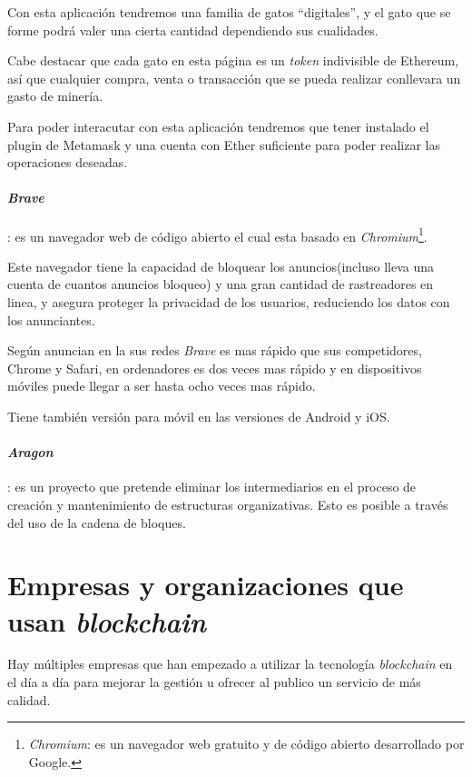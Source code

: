 Con esta aplicación tendremos una familia de gatos ``digitales''\cite{gatos}, y el gato que se forme podrá valer una cierta cantidad dependiendo sus cualidades. 

Cabe destacar que cada gato en esta página es un \textit{token} indivisible de Ethereum, así que cualquier compra, venta o transacción que se pueda realizar conllevara un  gasto de minería.

Para poder interacutar con esta aplicación tendremos que tener instalado el plugin de Metamask y una cuenta con Ether suficiente para poder realizar las operaciones deseadas.

\paragraph{\textit{Brave}}\cite{brave}: es un navegador web de código abierto el cual esta basado en \textit{Chromium}\footnote{\textit{Chromium}:\cite{chromium} es un navegador web gratuito y de código abierto desarrollado por Google.}.

Este navegador tiene la capacidad de bloquear los anuncios(incluso lleva una cuenta de cuantos anuncios bloqueo) y una gran cantidad de rastreadores en linea, y asegura proteger la privacidad de los usuarios, reduciendo los datos con los anunciantes.

Según anuncian en la sus redes \textit{Brave} es mas rápido que sus competidores, Chrome y Safari, en ordenadores es dos veces mas rápido y en dispositivos móviles puede llegar a ser hasta ocho veces mas rápido.

Tiene también versión para móvil en las versiones de Android y iOS.

\paragraph{\textit{Aragon}}: es un proyecto que pretende eliminar los intermediarios en el proceso de creación y mantenimiento de estructuras organizativas. Esto es posible a través del uso de la cadena de bloques.


\section{Empresas y organizaciones que usan \textit{blockchain}}

Hay múltiples empresas que han empezado a utilizar la tecnología \textit{blockchain} en el día a día para mejorar la gestión u ofrecer al publico un servicio de más calidad.

